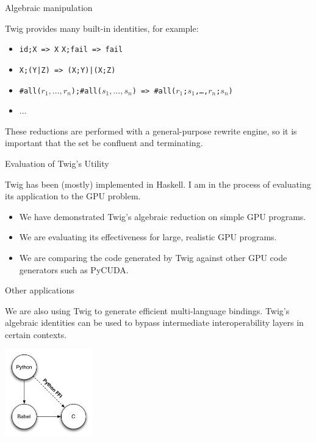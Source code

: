 \documentclass{beamer}
\begin{document}
\begin{frame}[fragile]{Algebraic manipulation}

Twig provides many built-in identities, for example:

\begin{itemize}
  \item \texttt{id;X => X}
  \teim \texttt{X;fail => fail}
  \item \texttt{X;(Y|Z) => (X;Y)|(X;Z)}
  \item \texttt{\#all($r_1,\ldots,r_n$);\#all($s_1,\ldots,s_n$) => 
  \#all($r_1$;$s_1$,\ldots,$r_n$;$s_n$)}
  \item $\ldots$
\end{itemize}

These reductions are performed with a general-purpose rewrite engine, so it is
important that the set be confluent and terminating.

\end{frame}


\begin{frame}[fragile]{Evaluation of Twig's Utility}

Twig has been (mostly) implemented in Haskell. I am in the process of
evaluating its application to the GPU problem.

\begin{itemize}

\item We have demonstrated Twig's algebraic reduction on simple GPU programs.

\item We are evaluating its effectiveness for large, realistic GPU programs.

\item We are comparing the code generated by Twig against other GPU code
generators such as PyCUDA.

\end{itemize}

\end{frame}


\begin{frame}[fragile]{Other applications}

We are also using Twig to generate efficient multi-language bindings. Twig's
algebraic identities can be used to bypass intermediate interoperability
layers in certain contexts.

\begin{center}
\includegraphics[height=1.5in]{images/multi-language}
\end{center}

\end{frame}
\end{document}
